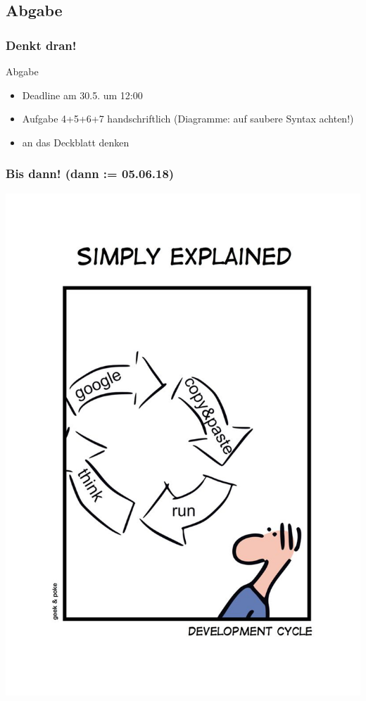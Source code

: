 \documentclass[18pt]{beamer}
\begin{document}
	\subsection{Abgabe}
	\begin{frame}
		\frametitle{Denkt dran!}
		\begin{alertblock}{Abgabe}
			\begin{itemize}
				\item Deadline am 30.5. um 12:00
				\item Aufgabe 4+5+6+7 handschriftlich (Diagramme: auf saubere Syntax achten!)
				\item an das Deckblatt denken
			\end{itemize}
		\end{alertblock}
	\end{frame}
		
	\begin{frame}
		\frametitle{Bis dann! (dann := 05.06.18)}
		\centering
		\includegraphics[scale=0.9]{./comics/geek_and_poke_development.jpg}
	\end{frame}
\end{document}

